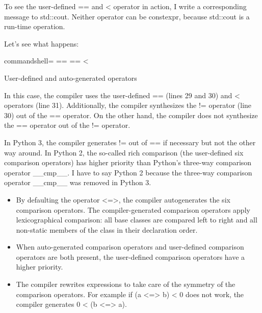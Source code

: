 To see the user-defined == and < operator in action, I write a corresponding message to std::cout. Neither operator can be constexpr, because std::cout is a run-time operation.

Let’s see what happens:

\begin{tcblisting}{commandshell={}}
==
==
<
\end{tcblisting}

\begin{center}
User-defined and auto-generated operators
\end{center}

In this case, the compiler uses the user-defined == (lines 29 and 30) and < operators (line 31). Additionally, the compiler synthesizes the != operator (line 30) out of the == operator. On the other hand, the compiler does not synthesize the == operator out of the != operator.

\begin{tcolorbox}[colback=blue!5!white,colframe=blue!75!black,title={Similarity to Python}]
In Python 3, the compiler generates != out of == if necessary but not the other way around. In Python 2, the so-called rich comparison (the user-defined six comparison operators) has higher priority than Python’s three-way comparison operator \_\_cmp\_\_. I have to say Python 2 because the three-way comparison operator \_\_cmp\_\_ was removed in Python 3.	
\end{tcolorbox}	

\begin{tcolorbox}[colback=mygreen!5!white,colframe=mygreen!75!black,title={Distilled Information}]
\begin{itemize}
\item 
By defaulting the operator <=>, the compiler autogenerates the six comparison operators. The compiler-generated comparison operators apply lexicographical comparison: all base classes are compared left to right and all non-static members of the class in their declaration order.

\item 
When auto-generated comparison operators and user-defined comparison operators are both present, the user-defined comparison operators have a higher priority.

\item 
The compiler rewrites expressions to take care of the symmetry of the comparison operators. For example if (a <=> b) < 0 does not work, the compiler generates 0 < (b <=> a).
\end{itemize}
\end{tcolorbox}	
























